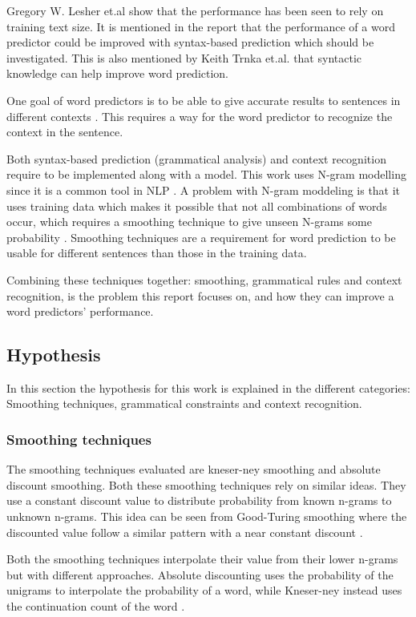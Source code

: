 Gregory W. Lesher et.al \cite{Lesher99effectsof} show that the performance has been seen to rely on training text size. It is mentioned in the report that the performance of a word predictor could be improved with syntax-based prediction which should be investigated. This is also mentioned by Keith Trnka et.al.\cite{keystrokes} that syntactic knowledge can help improve word prediction.
 
One goal of word predictors is to be able to give accurate results to sentences in different contexts \cite{DBLP:journals/corr/cs-CL-0009027}. This requires a way for the word predictor to recognize the context in the sentence.
 
Both syntax-based prediction (grammatical analysis) and context recognition require to be implemented along with a model. This work uses N-gram modelling since it is a common tool in NLP \cite{Wandmacher}. A problem with N-gram moddeling is that it uses training data which makes it possible that not all combinations of words occur, which requires a smoothing technique to give unseen N-grams some probability \cite{Russel}. Smoothing techniques are a requirement for word prediction to be usable for different sentences than those in the training data.
 
Combining  these techniques together: smoothing, grammatical rules and context recognition, is the problem this report focuses on, and how they can improve a word predictors' performance.

\subsection{Hypothesis}
In this section the hypothesis for this work is explained in the different categories: Smoothing techniques, grammatical constraints and context recognition.
\subsubsection{Smoothing techniques}
The smoothing techniques evaluated are kneser-ney smoothing and absolute discount smoothing. Both these smoothing techniques rely on similar ideas. They use a constant discount value to distribute probability from known n-grams to unknown n-grams. This idea can be seen from Good-Turing smoothing where the discounted value follow a similar pattern with a near constant discount \cite{coursera}.

Both the smoothing techniques interpolate their value from their lower n-grams but with different approaches. Absolute discounting uses the probability of the unigrams to interpolate the probability of a word, while Kneser-ney instead uses the continuation count of the word \cite{coursera}.

